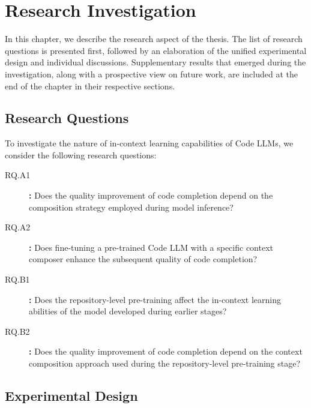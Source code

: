 \chapter{Research Investigation}\label{chap:research-investigation}  %

In this chapter, we describe the research aspect of the thesis. The list of research questions is presented first, followed by an elaboration of the unified experimental design and individual discussions. Supplementary results that emerged during the investigation, along with a prospective view on future work, are included at the end of the chapter in their respective sections. 

\section{Research Questions}

To investigate the nature of in-context learning capabilities of Code LLMs, we consider the following research questions:

\begin{sloppypar}
\begin{description}
    \item[RQ.A1]\label{rq:rq-a1} \textbf{:} Does the quality improvement of code completion depend on the composition strategy employed during model inference?
    \item[RQ.A2]\label{rq:rq-a2} \textbf{:} Does fine-tuning a pre-trained Code LLM with a specific context composer enhance the subsequent quality of code completion?
    \item[RQ.B1]\label{rq:rq-b1} \textbf{:} Does the repository-level pre-training affect the in-context learning abilities of the model developed during earlier stages?
    \item[RQ.B2]\label{rq:rq-b2} \textbf{:} Does the quality improvement of code completion depend on the context composition approach used during the repository-level pre-training stage?
\end{description}
\end{sloppypar}

\section{Experimental Design}

